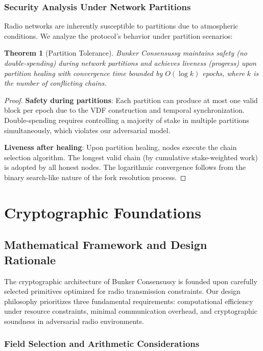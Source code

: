 \documentclass[11pt,a4paper]{article}
\newtheorem{theorem}{Theorem}[section]
\begin{document}
\subsubsection{Security Analysis Under Network Partitions}

Radio networks are inherently susceptible to partitions due to atmospheric conditions. We analyze the protocol's behavior under partition scenarios:

\begin{theorem}[Partition Tolerance]
Bunker Consensussy maintains safety (no double-spending) during network partitions and achieves liveness (progress) upon partition healing with convergence time bounded by $O(\log k)$ epochs, where $k$ is the number of conflicting chains.
\end{theorem}

\begin{proof}
\textbf{Safety during partitions}: Each partition can produce at most one valid block per epoch due to the VDF construction and temporal synchronization. Double-spending requires controlling a majority of stake in multiple partitions simultaneously, which violates our adversarial model.

\textbf{Liveness after healing}: Upon partition healing, nodes execute the chain selection algorithm. The longest valid chain (by cumulative stake-weighted work) is adopted by all honest nodes. The logarithmic convergence follows from the binary search-like nature of the fork resolution process.
\end{proof}

\section{Cryptographic Foundations}

\subsection{Mathematical Framework and Design Rationale}

The cryptographic architecture of Bunker Consensussy is founded upon carefully selected primitives optimized for radio transmission constraints. Our design philosophy prioritizes three fundamental requirements: computational efficiency under resource constraints, minimal communication overhead, and cryptographic soundness in adversarial radio environments.

\subsubsection{Field Selection and Arithmetic Considerations}
\end{document}
